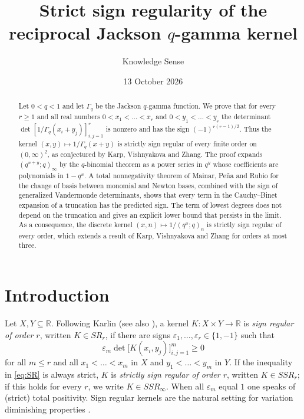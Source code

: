 \documentclass{amsart}
\theoremstyle{remark}
\numberwithin{equation}{section}
\newcommand{\R}{\mathbb{R}}
\begin{document}
\title[The reciprocal Jackson $q$-gamma kernel]{Strict sign regularity of the reciprocal Jackson $q$-gamma kernel}

\author{Knowledge Sense}

\date{13 October 2026}



\begin{abstract}
Let $0<q<1$ and let $\Gamma_q$ be the Jackson $q$-gamma function. We prove that for every $r\ge 1$ and all real numbers $0<x_1<\dots<x_r$ and $0<y_1<\dots<y_r$ the determinant $\det[1/\Gamma_q(x_i+y_j)]_{i,j=1}^r$ is nonzero and has the sign $(-1)^{r(r-1)/2}$. Thus the kernel $(x,y)\mapsto 1/\Gamma_q(x+y)$ is strictly sign regular of every finite order on $(0,\infty)^2$, as conjectured by Karp, Vishnyakova and Zhang. The proof expands $(q^{x+y};q)_\infty$ by the $q$-binomial theorem as a power series in $q^{y}$ whose coefficients are polynomials in $1-q^{x}$. A total nonnegativity theorem of Mainar, Pe\~na and Rubio for the change of basis between monomial and Newton bases, combined with the sign of generalized Vandermonde determinants, shows that every term in the Cauchy--Binet expansion of a truncation has the predicted sign. The term of lowest degrees does not depend on the truncation and gives an explicit lower bound that persists in the limit. As a consequence, the discrete kernel $(x,n)\mapsto 1/(q^x;q)_n$ is strictly sign regular of every order, which extends a result of Karp, Vishnyakova and Zhang for orders at most three.
\end{abstract}

\maketitle

\section{Introduction}

Let $X,Y\subseteq\R$. Following Karlin \cite[Chapter~2, \S1]{Karlin} (see also \cite[Definition~2.1]{KVZ}), a kernel $K\colon X\times Y\to\R$ is \emph{sign regular of order $r$}, written $K\in SR_r$, if there are signs $\varepsilon_1,\dots,\varepsilon_r\in\{1,-1\}$ such that
\begin{equation}\label{eq:SR}
\varepsilon_m\det\bigl[K(x_i,y_j)\bigr]_{i,j=1}^m\ge 0
\end{equation}
for all $m\le r$ and all $x_1<\dots<x_m$ in $X$ and $y_1<\dots<y_m$ in $Y$. If the inequality in \eqref{eq:SR} is always strict, $K$ is \emph{strictly sign regular of order $r$}, written $K\in SSR_r$; if this holds for every $r$, we write $K\in SSR_\infty$. When all $\varepsilon_m$ equal $1$ one speaks of (strict) total positivity. Sign regular kernels are the natural setting for variation diminishing properties \cite[Chapter~5]{Karlin}.
\end{document}
